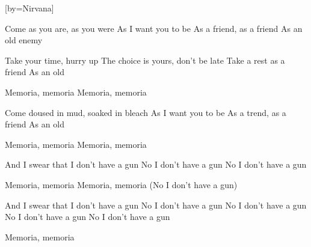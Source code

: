  





[by=Nirvana]



\beginverse
Come as you are, as you were
As I want you to be
As a friend, as a friend
As an old enemy

Take your time, hurry up
The choice is yours, don't be late
Take a rest as a friend
As an old
\endverse

\beginchorus
Memoria, memoria
Memoria, memoria
\endchorus

\beginverse
Come doused in mud, soaked in bleach
As I want you to be
As a trend, as a friend
As an old
\endverse

\beginchorus
Memoria, memoria
Memoria, memoria
\endchorus

\beginverse
And I swear that I don't have a gun
No I don't have a gun
No I don't have a gun
\endverse

\beginchorus
Memoria, memoria
Memoria, memoria
(No I don't have a gun)

And I swear that I don't have a gun
No I don't have a gun
No I don't have a gun
No I don't have a gun
No I don't have a gun

Memoria, memoria
\endchorus



\endsong
